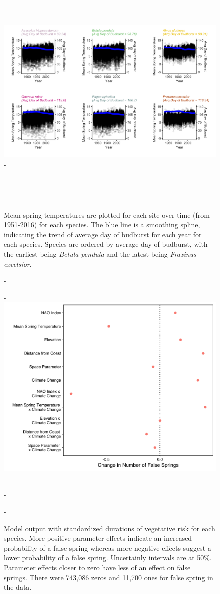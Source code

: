 \documentclass{article}\usepackage[]{graphicx}\usepackage[]{color}
\begin{document}
{\begin{figure} [H]
  -\begin{center}
  -\includegraphics[width=16cm]{..//figures/MSTBB_bySpp.png}
  -\caption{Mean spring temperatures are plotted for each site over time (from 1951-2016) for each species. The blue line is a smoothing spline, indicating the trend of average day of budburst for each year for each species. Species are ordered by average day of budburst, with the earliest being \textit{Betula pendula} and the latest being \textit{Fraxinus excelsior}. }\label{fig:mst}
  -\end{center}
  -\end{figure}}
  
  
{\begin{figure} [H]
  -\begin{center}
  -\includegraphics[width=12cm]{..//figures/model_output_orig_50.pdf}
  -\caption{Model output with standardized durations of vegetative risk for each species. More positive parameter effects indicate an increased probability of a false spring whereas more negative effects suggest a lower probability of a false spring. Uncertainly intervals are at 50\%. Parameter effects closer to zero have less of an effect on false springs. There were 743,086 zeros and 11,700 ones for false spring in the data.}\label{fig:maineffects}
  -\end{center}
  -\end{figure}}
  
\end{document}
